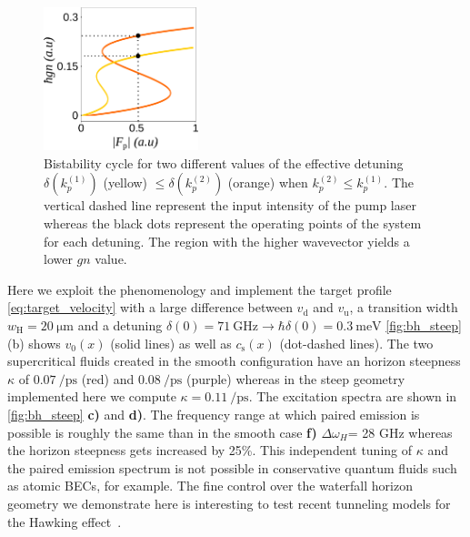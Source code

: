 \begin{figure}
    \centering
    \includegraphics[width=0.4\textwidth]{chap_custom_st/fig/bistab_to_gn.pdf}
    \caption{Bistability cycle for two different values of the effective detuning $\delta(k^{(1)}_p)$ (yellow) $\leq \delta(k^{(2)}_p) $ (orange) when $k^{(2)}_p \leq k^{(1)}_p $. The vertical dashed line
    represent the input intensity of the pump laser whereas the black dots represent the operating points of the system for each detuning. The region with the higher wavevector
    yields a lower $gn$ value.}
    \label{fig:bistab_steep}
\end{figure}

Here we exploit the phenomenology and implement the target profile \autoref{eq:target_velocity} with a large difference between $v_\mathrm{d}$ and $v_\mathrm{u}$, a transition width $w_\mathrm{H}=\SI{20}{\micro\meter}$ and a detuning $\delta(0)=\SI{71}{\giga\hertz} \rightarrow\hbar\delta(0)=\SI{0.3}{\milli \electronvolt}$
\autoref{fig:bh_steep} (b) shows $v_0(x)$ (solid lines) as well as $c_\mathrm{s}(x)$ (dot-dashed lines). The two supercritical fluids created in the smooth configuration 
have an horizon steepness $\kappa$ of $\SI{0.07}{\per \pico \second}$ (red) and $\SI{0.08}{\per \pico \second}$ (purple) whereas in the steep geometry implemented here we compute $\kappa = \SI{0.11}{\per \pico \second}$. The excitation spectra are shown in \autoref{fig:bh_steep} \textbf{c)} and \textbf{d)}.
The frequency range at which paired emission is possible is roughly the same than in the smooth case \textbf{f)} $\Delta \omega_H$= 28 GHz whereas the horizon steepness 
gets increased by 25\%. This independent tuning of $\kappa$ and the paired emission spectrum is not possible in conservative quantum fluids such as atomic BECs, for example.
The fine control over the waterfall horizon geometry we demonstrate here is interesting to test recent tunneling models for the Hawking effect~\cite{delporro2024tunneling}.


